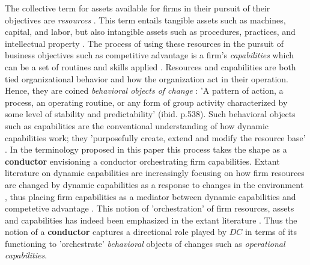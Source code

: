 \documentclass[review,fleqn]{elsarticle}\usepackage[]{graphicx}\usepackage[]{color}
\begin{document}
The collective term for assets available for firms in their pursuit of their objectives
are \emph{resources} \citep{Helfat2011,Helfat2007}. This term entails tangible assets such
as machines, capital, and labor, but also intangible assets such as procedures, practices,
and intellectual property \citep{Pisano2017}. The process of using these resources in the
pursuit of business objectives such as competitive advantage is a firm's
\emph{capabilities} which can be a set of routines and skills applied
\citep{Helfat2007,Helfat2011}. Resources and capabilities are both tied organizational
behavior and how the organization act in their operation. Hence, they are coined
\emph{behavioral objects of change} \citep{Verona2011}: 'A pattern of action, a process,
an operating routine, or any form of group activity characterized by some level of
stability and predictability' (ibid. p.538). Such behavioral objects such as capabilities
are the conventional understanding of how dynamic capabilities work; they 'purposefully
create, extend and modify the resource base' \cite[p. 4]{Helfat2007}. In the terminology
proposed in this paper this process takes the shape as a {\bf conductor} envisioning a
conductor orchestrating firm capabilities. Extant literature on dynamic capabilities are
increasingly focusing on how firm resources are changed by dynamic capabilities as a
response to changes in the environment \citep{Schilke2018,Eriksson2014}, thus placing firm
capabilities as a mediator between dynamic capabilities and competetive advantage
\citep{Helfat2007}. This notion of 'orchestration' of firm resources, assets and
capabilities has indeed been emphasized in the extant literature
\citep{Sirmon2011,Helfat2015}. Thus the notion of a {\bf conductor} captures a directional
role played by $DC$ in terms of its functioning to 'orchestrate' \emph{behavioral}
objects of changes such as \emph{operational capabilities}.
\end{document}
